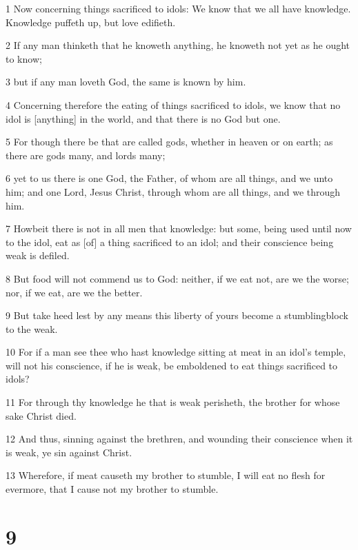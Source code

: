 \par 1 Now concerning things sacrificed to idols: We know that we all have knowledge. Knowledge puffeth up, but love edifieth.
\par 2 If any man thinketh that he knoweth anything, he knoweth not yet as he ought to know;
\par 3 but if any man loveth God, the same is known by him.
\par 4 Concerning therefore the eating of things sacrificed to idols, we know that no idol is [anything] in the world, and that there is no God but one.
\par 5 For though there be that are called gods, whether in heaven or on earth; as there are gods many, and lords many;
\par 6 yet to us there is one God, the Father, of whom are all things, and we unto him; and one Lord, Jesus Christ, through whom are all things, and we through him.
\par 7 Howbeit there is not in all men that knowledge: but some, being used until now to the idol, eat as [of] a thing sacrificed to an idol; and their conscience being weak is defiled.
\par 8 But food will not commend us to God: neither, if we eat not, are we the worse; nor, if we eat, are we the better.
\par 9 But take heed lest by any means this liberty of yours become a stumblingblock to the weak.
\par 10 For if a man see thee who hast knowledge sitting at meat in an idol's temple, will not his conscience, if he is weak, be emboldened to eat things sacrificed to idols?
\par 11 For through thy knowledge he that is weak perisheth, the brother for whose sake Christ died.
\par 12 And thus, sinning against the brethren, and wounding their conscience when it is weak, ye sin against Christ.
\par 13 Wherefore, if meat causeth my brother to stumble, I will eat no flesh for evermore, that I cause not my brother to stumble.

\chapter{9}

